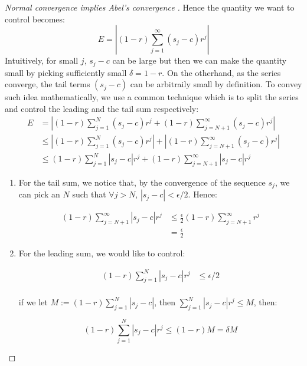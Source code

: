 \begin{proof}[Normal convergence implies Abel's convergence ]
Hence the quantity we want to control becomes:
\begin{equation}
E=\left| (1-r)\sum_{j=1}^{\infty} (s_j-c)r^j\right|
\end{equation}
Intuitively, for small $j$, $s_j -c$ can be large but then we can make the quantity small by picking sufficiently small $\delta=1 -r$. On the otherhand, as the series converge, the tail terms $(s_j -c)$ can be arbitraily small by definition. To convey such idea mathematically, we use a common technique which is to split the series and control the leading and the tail sum respectively:
\begin{equation}
\begin{aligned}
E &= \left| (1-r)\sum_{j=1}^{N} (s_j-c)r^j + (1-r)\sum_{j=N+1}^{\infty} (s_j-c)r^j\right| \\
&\leq \left| (1-r)\sum_{j=1}^{N} (s_j-c)r^j \right| +  \left|(1-r)\sum_{j=N+1}^{\infty} (s_j-c)r^j\right| \\
&\leq  (1-r)\sum_{j=1}^{N} |s_j-c|r^j  +  (1-r)\sum_{j=N+1}^{\infty} |s_j-c|r^j
\end{aligned}
\end{equation}

\begin{enumerate}
\item For the tail sum, we notice that, by the convergence of the sequence $s_j$, we can pick an $N$ such that $\forall j > N$, $|s_j -c|<\epsilon/2$. Hence:

\begin{equation}
\begin{aligned}
(1-r)\sum_{j=N+1}^{\infty} |s_j-c|r^j &\leq \frac{\epsilon}{2}(1-r)\sum_{j=N+1}^{\infty} r^j \\ 
&= \frac{\epsilon}{2}
\end{aligned}
\end{equation}


\item For the leading sum, we would like to control:

\begin{equation}
\begin{aligned}
(1-r)\sum_{j=1}^{N} |s_j-c|r^j&\leq \epsilon/2 \\
\end{aligned}
\end{equation}


if we let $M:=(1 -r)\sum_{j=1}^{N} |s_j -c|$, then $\sum_{j=1}^{N} |s_j -c|r^j \leq M$, then:

\begin{equation}
(1-r)\sum_{j=1}^{N} |s_j-c|r^j\leq (1-r)M = \delta M
\end{equation}



\end{enumerate}
\end{proof}
